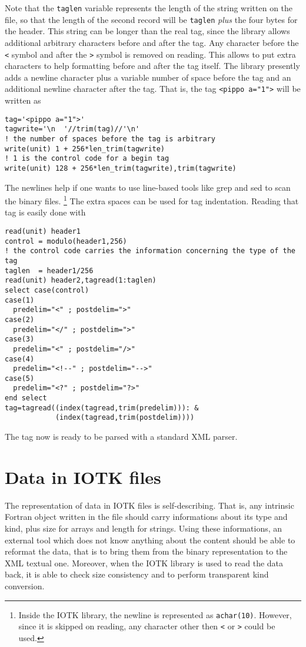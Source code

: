 \documentclass[12pt]{article}
\begin{document}
Note that the {\tt taglen} variable represents the length of
the string written on the file, so that the length of
the second record will be {\tt taglen} \emph{plus} the
four bytes for the header.
This string can be longer than the real tag, since
the library allows additional arbitrary characters
before and after the tag.
Any character before the {\tt <} symbol and after the
{\tt >} symbol is removed on reading. This allows
to put extra characters to help formatting before
and after the tag itself. The library presently adds
a newline character plus a variable number of space before
the tag and an additional newline character after the tag.
That is, the tag {\tt <pippo a="1">} will
be written as
\begin{verbatim}
tag='<pippo a="1">'
tagwrite='\n  '//trim(tag)//'\n'
! the number of spaces before the tag is arbitrary
write(unit) 1 + 256*len_trim(tagwrite)
! 1 is the control code for a begin tag
write(unit) 128 + 256*len_trim(tagwrite),trim(tagwrite)
\end{verbatim}
The newlines help if one wants to use line-based tools like grep and sed to scan the binary files.%
\footnote{Inside the IOTK library, the newline is represented as {\tt achar(10)}.
However, since it is skipped on reading, any character other then {\tt <}
or {\tt >} could be used.}
The extra spaces can be used for tag indentation.
Reading that tag is easily done with
\begin{verbatim}
read(unit) header1
control = modulo(header1,256)
! the control code carries the information concerning the type of the tag
taglen  = header1/256
read(unit) header2,tagread(1:taglen)
select case(control)
case(1)
  predelim="<" ; postdelim=">"
case(2)
  predelim="</" ; postdelim=">"
case(3)
  predelim="<" ; postdelim="/>"
case(4)
  predelim="<!--" ; postdelim="-->"
case(5)
  predelim="<?" ; postdelim="?>"
end select
tag=tagread((index(tagread,trim(predelim))): &
            (index(tagread,trim(postdelim))))
\end{verbatim}
The tag now is ready to be parsed with a standard XML parser.

\section{Data in IOTK files}

The representation of data in IOTK files is self-describing.
That is, any intrinsic Fortran object written in the file
should carry informations about its type and kind, plus
size for arrays and length for strings.
Using these informations, an external tool which does not
know anything about the content should be able
to reformat the data, that is to bring them from the binary
representation to the XML textual one.
Moreover, when the IOTK library is used to read the data back,
it is able to check size consistency and to
perform transparent kind conversion.
\end{document}
